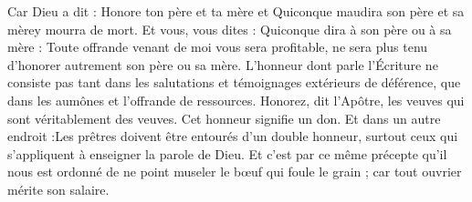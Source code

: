 Car Dieu a dit : Honore ton père et ta mère et Quiconque maudira son père et sa mèrey mourra de mort. Et vous, vous dites : Quiconque dira à son père ou à sa mère : Toute offrande venant de moi vous sera profitable, ne sera plus tenu d’honorer autrement son père ou sa mère. L’honneur dont parle l’Écriture ne consiste pas tant dans les salutations et témoignages extérieurs de déférence, que dans les aumônes et l’offrande de ressources. Honorez, dit l’Apôtre, les veuves qui sont véritablement des veuves. Cet honneur signifie un don. Et dans un autre endroit :Les prêtres doivent être entourés d'un double honneur, surtout ceux qui s'appliquent à enseigner la parole de Dieu. Et c’est par ce même précepte qu’il nous est ordonné de ne point museler le bœuf qui foule le grain ; car tout ouvrier mérite son salaire.
